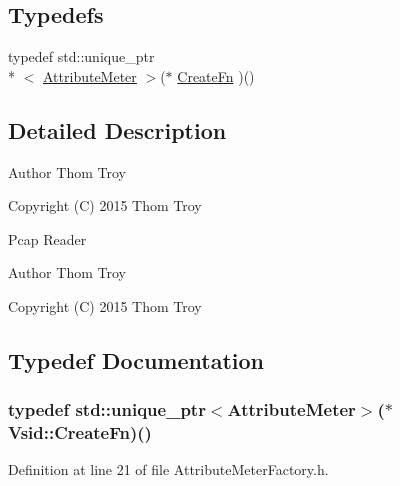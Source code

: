\subsection*{Typedefs}
\begin{DoxyCompactItemize}
\item 
typedef std\-::unique\-\_\-ptr\\*
$<$ \hyperlink{class_vsid_1_1_attribute_meter}{Attribute\-Meter} $>$($\ast$ \hyperlink{namespace_vsid_a2e5380ba00fdc73183f700ae57702bc3}{Create\-Fn} )()
\end{DoxyCompactItemize}


\subsection{Detailed Description}
\begin{DoxyAuthor}{Author}
Thom Troy
\end{DoxyAuthor}
Copyright (C) 2015 Thom Troy

Pcap Reader

\begin{DoxyAuthor}{Author}
Thom Troy
\end{DoxyAuthor}
Copyright (C) 2015 Thom Troy 

\subsection{Typedef Documentation}
\hypertarget{namespace_vsid_a2e5380ba00fdc73183f700ae57702bc3}{
\subsubsection[{Create\-Fn}]{\setlength{\rightskip}{0pt plus 5cm}typedef std\-::unique\-\_\-ptr$<${\bf Attribute\-Meter}$>$($\ast$ Vsid\-::\-Create\-Fn)()}}\label{namespace_vsid_a2e5380ba00fdc73183f700ae57702bc3}


Definition at line 21 of file Attribute\-Meter\-Factory.\-h.

